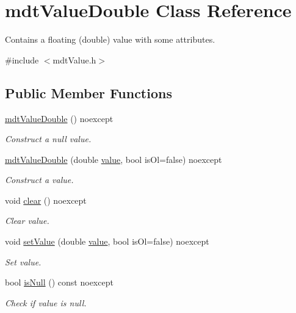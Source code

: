 \hypertarget{classmdt_value_double}{\section{mdt\-Value\-Double Class Reference}
\label{classmdt_value_double}
}


Contains a floating (double) value with some attributes.  




{\ttfamily \#include $<$mdt\-Value.\-h$>$}

\subsection*{Public Member Functions}
\begin{DoxyCompactItemize}
\item 
\hyperlink{classmdt_value_double_a929aad55cfe2321c6702be3e08c44e4e}{mdt\-Value\-Double} () noexcept
\begin{DoxyCompactList}\small\item\em Construct a null value. \end{DoxyCompactList}\item 
\hyperlink{classmdt_value_double_ace7f96511809b6636fec72868d2f7c52}{mdt\-Value\-Double} (double \hyperlink{classmdt_value_double_a0cd139b92f5601b5c86f79374e918db4}{value}, bool is\-Ol=false) noexcept
\begin{DoxyCompactList}\small\item\em Construct a value. \end{DoxyCompactList}\item 
void \hyperlink{classmdt_value_double_aa1c4c250fb9a93537f3cb0ca3d29e2d4}{clear} () noexcept
\begin{DoxyCompactList}\small\item\em Clear value. \end{DoxyCompactList}\item 
void \hyperlink{classmdt_value_double_aab6e3bcbb5aebb75163c792b2604991e}{set\-Value} (double \hyperlink{classmdt_value_double_a0cd139b92f5601b5c86f79374e918db4}{value}, bool is\-Ol=false) noexcept
\begin{DoxyCompactList}\small\item\em Set value. \end{DoxyCompactList}\item 
bool \hyperlink{classmdt_value_double_a07587e97225c3df7af4596d451ac2dc9}{is\-Null} () const noexcept
\begin{DoxyCompactList}\small\item\em Check if value is null. \end{DoxyCompactList}\item 

\end{DoxyCompactItemize}
